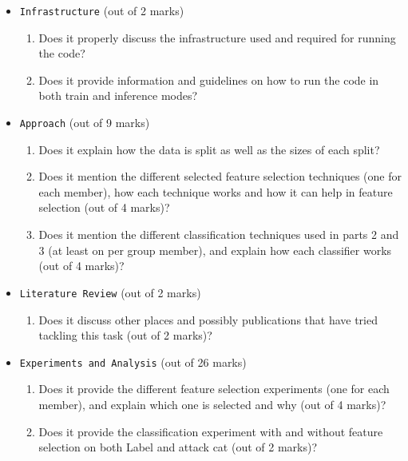 \begin{itemize}
\begin{itemize}
\begin{enumerate}
                \answerTODO{}
        \end{enumerate}
        \item \texttt{Infrastructure} (out of 2 marks) 
        \begin{enumerate}
            \item Does it properly discuss the infrastructure used and required for running the code?
            \answerTODO{}
            \item Does it provide information and guidelines on how to run the code in both train and inference modes?
            \answerTODO{}
        \end{enumerate}
        \item \texttt{Approach} (out of 9 marks)
        \begin{enumerate}
            \item Does it explain how the data is split as well as the sizes of each split?
                \answerTODO{}
            \item Does it mention the different selected feature selection techniques (one for each member), how each technique works and how it can help in feature selection (out of 4 marks)?
                \answerTODO{}
            \item Does it mention the different classification techniques used in parts 2 and 3 (at least on per group member), and explain how each classifier works (out of 4 marks)?
                \answerTODO{}
        \end{enumerate}
        \item \texttt{Literature Review} (out of 2 marks) 
        \begin{enumerate}
            \item Does it discuss other places and possibly publications that have tried tackling this task (out of 2 marks)?
                \answerTODO{}
        \end{enumerate}
        \item \texttt{Experiments and Analysis} (out of 26 marks)
        \begin{enumerate}
            \item Does it provide the different feature selection experiments (one for each member), and explain which one is selected and why (out of 4 marks)?
                \answerTODO{}
            \item Does it provide the classification experiment with and without feature selection on both Label and attack cat (out of 2 marks)?
                \answerTODO{}

\end{enumerate}
\end{itemize}
\end{itemize}
